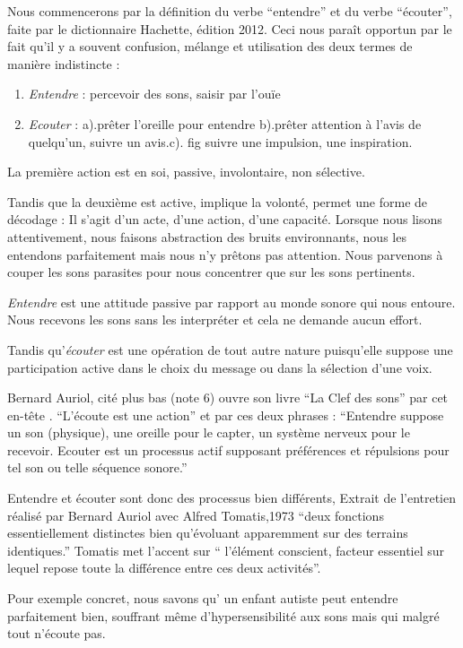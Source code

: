 \documentclass[12pt,french]{report}
\makeatletter
\let\SF@@footnote\footnote
\def\footnote{\ifx\protect\@typeset@protect
    \expandafter\SF@@footnote
  \else
    \expandafter\SF@gobble@opt
  \fi
}
\edef\SF@gobble@opt{\noexpand\protect
  \expandafter\noexpand\csname SF@gobble@opt \endcsname}
\makeatother
\begin{document}
Nous commencerons par la définition du verbe ``entendre'' et du
verbe ``écouter'', faite par le dictionnaire Hachette, édition 2012.
Ceci nous paraît opportun par le fait qu'il y a souvent confusion,
mélange et utilisation des deux termes de manière indistincte : 
\begin{enumerate}
\item \emph{Entendre }: percevoir des sons, saisir par l'ouïe
\item \emph{Ecouter} : a).prêter l'oreille pour entendre b).prêter attention
à l'avis de quelqu'un, suivre un avis.c). fig suivre une impulsion,
une inspiration.
\end{enumerate}
La première action est en soi, passive, involontaire, non sélective. 

Tandis que la deuxième est active, implique la volonté, permet une
forme de décodage : Il s'agit d'un acte, d'une action, d'une capacité.\emph{
}Lorsque nous lisons attentivement, nous faisons abstraction des bruits
environnants, nous les entendons parfaitement mais nous n'y prêtons
pas attention. Nous parvenons à couper les sons parasites pour nous
concentrer que sur les sons pertinents.

\emph{Entendre} est une attitude passive par rapport au monde sonore
qui nous entoure. Nous recevons les sons sans les interpréter et cela
ne demande aucun effort.

Tandis qu'\emph{écouter} est une opération de tout autre nature puisqu'elle
suppose une participation active dans le choix du message ou dans
la sélection d'une voix.

Bernard Auriol, cité plus bas (note 6) ouvre son livre ``La Clef
des sons'' par cet en-tête . ``L'écoute est une action'' et par
ces deux phrases : ``Entendre suppose un son (physique), une oreille
pour le capter, un système nerveux pour le recevoir. Ecouter est un
processus actif supposant préférences et répulsions pour tel son ou
telle séquence sonore.''

Entendre et écouter sont donc des processus bien différents, \footnote{Extrait de l'entretien réalisé par Bernard Auriol avec Alfred Tomatis,1973 }``deux
fonctions essentiellement distinctes bien qu'évoluant apparemment
sur des terrains identiques.'' Tomatis met l'accent sur `` l'élément
conscient, facteur essentiel sur lequel repose toute la différence
entre ces deux activités''.

Pour exemple concret, nous savons qu' un enfant autiste peut entendre
parfaitement bien, souffrant même d'hypersensibilité aux sons mais
qui malgré tout n'écoute pas.\emph{ }
\end{document}
